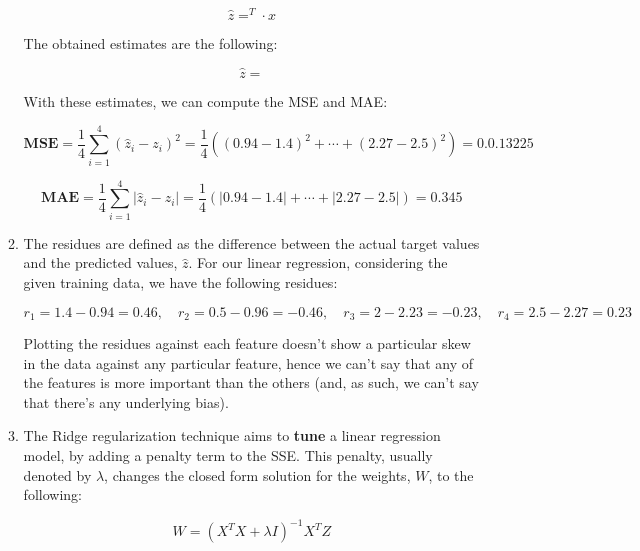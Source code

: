 \documentclass[12pt]{article}
\begin{document}
\begin{enumerate}[leftmargin=\labelsep]
\begin{enumerate}
{                \begin{equation*}
                  \hat{z} = ^T \cdot x
                \end{equation*}

                The obtained estimates are the following:

                \begin{equation*}
                  \hat{z} = 
                \end{equation*}

                With these estimates, we can compute the MSE and MAE:

                $$
                  \mathbf{MSE} = \frac{1}{4} \sum_{i=1}^4 (\hat{z}_i - z_i)^2
                  = \frac{1}{4} \left( (0.94 - 1.4)^2 + \cdots + (2.27 - 2.5)^2 \right)
                  = 0.0.13225
                $$

                $$
                  \mathbf{MAE} = \frac{1}{4} \sum_{i=1}^4 |\hat{z}_i - z_i|
                  = \frac{1}{4} \left( |0.94 - 1.4| + \cdots + |2.27 - 2.5| \right)
                  = 0.345
                $$
                }
          \item {
                The residues are defined as the difference between the actual target
                values and the predicted values, $\hat{z}$. For our linear regression,
                considering the given training data, we have the following residues:

                $$
                  r_1 = 1.4 - 0.94 = 0.46, \quad
                  r_2 = 0.5 - 0.96 = -0.46, \quad
                  r_3 = 2 - 2.23 = -0.23, \quad
                  r_4 = 2.5 - 2.27 = 0.23
                $$

                Plotting the residues against each feature doesn't show a particular
                skew in the data against any particular feature, hence we can't say
                that any of the features is more important than the others (and, as such,
                we can't say that there's any underlying bias).
                }
          \item {
                The Ridge regularization technique aims to \textbf{tune} a linear regression model,
                by adding a penalty term to the SSE. This penalty, usually denoted by $\lambda$,
                changes the closed form solution for the weights, $W$, to the following:

                \begin{equation*}
                  W = (X^T X + \lambda I)^{-1} X^T Z
                \end{equation*}

}
\end{enumerate}
\end{enumerate}
\end{document}
